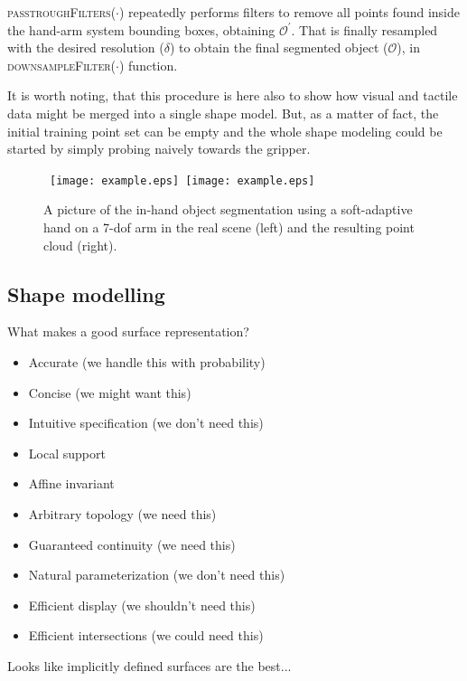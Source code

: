 \textsc{passtroughFilters}($\cdot$) repeatedly performs filters to remove
all points found inside the hand-arm system bounding boxes, obtaining $\mathcal{O^\prime}$.
That is finally resampled with the desired resolution ($\delta$) 
to obtain the final segmented object ($\mathcal{O}$), in \textsc{downsampleFilter}($\cdot$) function.

It is worth noting, that this procedure is here also to show how visual and tactile
data might  be merged into a  single shape model.
But,  as a matter of  fact, the
initial training  point set  can be  empty and the whole shape modeling could be 
started  by simply  probing naively towards the gripper.

\begin{figure}
\centering
  \mbox{
  \texttt{[image: example.eps]}
  \texttt{[image: example.eps]}
  }
  \caption{A picture of the in-hand object segmentation using a soft-adaptive hand on a 7-dof arm in the real scene (left) and the resulting point cloud (right).}
  \label{fig:in-hand-segmentation}
\end{figure}



\subsection{Shape modelling}
\label{sec:shape}
What makes a good surface representation?
\begin{itemize}
\item Accurate (we handle this with probability)
\item Concise (we might want this)
\item Intuitive specification (we don't need this)
\item Local support
\item Affine invariant 
\item Arbitrary topology (we need this)
\item Guaranteed continuity (we need this)
\item Natural parameterization (we don't need this)
\item Efficient display (we shouldn't need this)
\item Efficient intersections (we could need this)
\end{itemize}

Looks like implicitly defined surfaces are the best...

